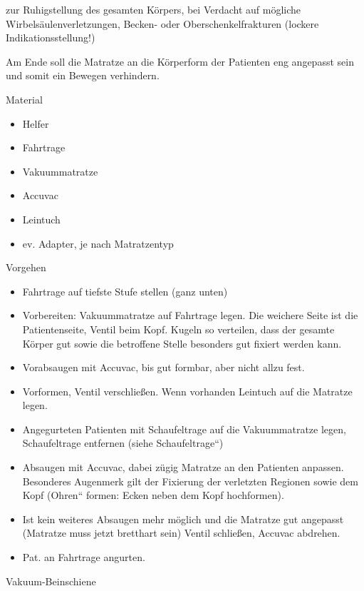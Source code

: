 \documentclass{article}
\begin{document}
{
zur Ruhigstellung des gesamten K\"orpers, bei Verdacht auf m\"ogliche
Wirbels\"aulenverletzungen, Becken- oder Oberschenkelfrakturen (lockere
Indikationsstellung!)}

{
Am Ende soll die Matratze an die K\"orperform der Patienten eng
angepasst sein und somit ein Bewegen verhindern.}

{\mdseries\color{black}
Material}

\begin{itemize}
\item { Helfer}

\item {\mdseries
Fahrtrage}

\item {\mdseries
Vakuummatratze}

\item {\mdseries
Accuvac}

\item {\mdseries
Leintuch}

\item {\mdseries
ev. Adapter, je nach Matratzentyp}

\end{itemize}
{\mdseries\color{black}
Vorgehen}

\begin{itemize}
\item {\mdseries
Fahrtrage auf tiefste Stufe stellen (ganz unten)}

\item {\mdseries
Vorbereiten: Vakuummatratze auf Fahrtrage legen. Die weichere Seite ist
die Patientenseite, Ventil beim Kopf. Kugeln so verteilen, dass der
gesamte K\"orper gut sowie die betroffene Stelle besonders gut fixiert
werden kann.}

\item {\mdseries
Vorabsaugen mit Accuvac, bis gut formbar, aber nicht allzu fest.}

\item {\mdseries
Vorformen, Ventil verschlie{\ss}en. Wenn vorhanden Leintuch auf die
Matratze legen.}

\item {\mdseries
Angegurteten Patienten mit Schaufeltrage auf die Vakuummatratze legen,
Schaufeltrage entfernen (siehe
{\quotedblbase}Schaufeltrage{\textquotedblleft})}

\item {\mdseries
Absaugen mit Accuvac, dabei z\"ugig Matratze an den Patienten anpassen.
Besonderes Augenmerk gilt der Fixierung der verletzten Regionen sowie
dem Kopf ({\quotedblbase}Ohren{\textquotedblleft} formen: Ecken neben
dem Kopf hochformen).}

\item {\mdseries
Ist kein weiteres Absaugen mehr m\"oglich und die Matratze gut angepasst
(Matratze muss jetzt bretthart sein) Ventil schlie{\ss}en, Accuvac
abdrehen.}

\item {\mdseries
Pat. an Fahrtrage angurten.}

\end{itemize}
{\mdseries\color[rgb]{0.0,0.0,0.5019608}
Vakuum-Beinschiene}
\end{document}

